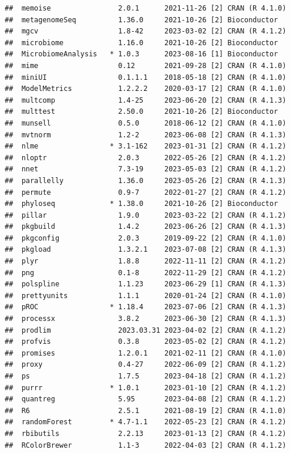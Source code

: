 \documentclass[
]{book}
\begin{document}
\begin{verbatim}
##  memoise                2.0.1      2021-11-26 [2] CRAN (R 4.1.0)
##  metagenomeSeq          1.36.0     2021-10-26 [2] Bioconductor
##  mgcv                   1.8-42     2023-03-02 [2] CRAN (R 4.1.2)
##  microbiome             1.16.0     2021-10-26 [2] Bioconductor
##  MicrobiomeAnalysis   * 1.0.3      2023-08-16 [1] Bioconductor
##  mime                   0.12       2021-09-28 [2] CRAN (R 4.1.0)
##  miniUI                 0.1.1.1    2018-05-18 [2] CRAN (R 4.1.0)
##  ModelMetrics           1.2.2.2    2020-03-17 [2] CRAN (R 4.1.0)
##  multcomp               1.4-25     2023-06-20 [2] CRAN (R 4.1.3)
##  multtest               2.50.0     2021-10-26 [2] Bioconductor
##  munsell                0.5.0      2018-06-12 [2] CRAN (R 4.1.0)
##  mvtnorm                1.2-2      2023-06-08 [2] CRAN (R 4.1.3)
##  nlme                 * 3.1-162    2023-01-31 [2] CRAN (R 4.1.2)
##  nloptr                 2.0.3      2022-05-26 [2] CRAN (R 4.1.2)
##  nnet                   7.3-19     2023-05-03 [2] CRAN (R 4.1.2)
##  parallelly             1.36.0     2023-05-26 [2] CRAN (R 4.1.3)
##  permute                0.9-7      2022-01-27 [2] CRAN (R 4.1.2)
##  phyloseq             * 1.38.0     2021-10-26 [2] Bioconductor
##  pillar                 1.9.0      2023-03-22 [2] CRAN (R 4.1.2)
##  pkgbuild               1.4.2      2023-06-26 [2] CRAN (R 4.1.3)
##  pkgconfig              2.0.3      2019-09-22 [2] CRAN (R 4.1.0)
##  pkgload                1.3.2.1    2023-07-08 [2] CRAN (R 4.1.3)
##  plyr                   1.8.8      2022-11-11 [2] CRAN (R 4.1.2)
##  png                    0.1-8      2022-11-29 [2] CRAN (R 4.1.2)
##  polspline              1.1.23     2023-06-29 [1] CRAN (R 4.1.3)
##  prettyunits            1.1.1      2020-01-24 [2] CRAN (R 4.1.0)
##  pROC                 * 1.18.4     2023-07-06 [2] CRAN (R 4.1.3)
##  processx               3.8.2      2023-06-30 [2] CRAN (R 4.1.3)
##  prodlim                2023.03.31 2023-04-02 [2] CRAN (R 4.1.2)
##  profvis                0.3.8      2023-05-02 [2] CRAN (R 4.1.2)
##  promises               1.2.0.1    2021-02-11 [2] CRAN (R 4.1.0)
##  proxy                  0.4-27     2022-06-09 [2] CRAN (R 4.1.2)
##  ps                     1.7.5      2023-04-18 [2] CRAN (R 4.1.2)
##  purrr                * 1.0.1      2023-01-10 [2] CRAN (R 4.1.2)
##  quantreg               5.95       2023-04-08 [2] CRAN (R 4.1.2)
##  R6                     2.5.1      2021-08-19 [2] CRAN (R 4.1.0)
##  randomForest         * 4.7-1.1    2022-05-23 [2] CRAN (R 4.1.2)
##  rbibutils              2.2.13     2023-01-13 [2] CRAN (R 4.1.2)
##  RColorBrewer           1.1-3      2022-04-03 [2] CRAN (R 4.1.2)

\end{verbatim}
\end{document}
